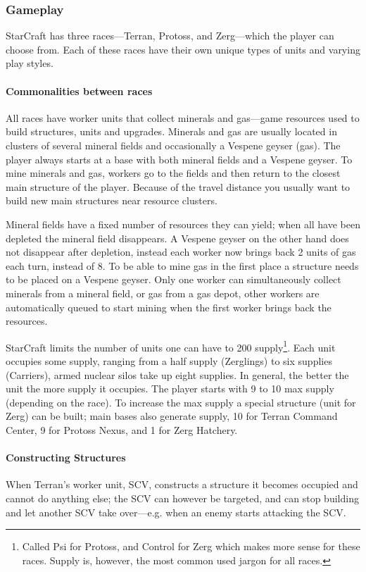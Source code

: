 \subsubsection{Gameplay} StarCraft has three races—Terran, Protoss, and Zerg—which the player can
choose from. Each of these races have their own unique types of units and varying play styles.

\paragraph{Commonalities between races} All races have worker units that collect minerals and
gas—game resources used to build structures, units and upgrades. Minerals and gas are usually
located in clusters of several mineral fields and occasionally a Vespene geyser (gas). The player
always starts at a base with both mineral fields and a Vespene geyser. To mine minerals and gas,
workers go to the fields and then return to the closest main structure of the player. Because of the
travel distance you usually want to build new main structures near resource clusters.

Mineral fields have a fixed number of resources they can yield; when all have been depleted the
mineral field disappears. A Vespene geyser on the other hand does not disappear after depletion,
instead each worker now brings back 2 units of gas each turn, instead of 8. To be able to mine gas
in the first place a structure needs to be placed on a Vespene geyser. Only one worker can
simultaneously collect minerals from a mineral field, or gas from a gas depot, other workers are
automatically queued to start mining when the first worker brings back the resources.

\label{sec:starcraft_supply} StarCraft limits the number of units one can have to 200
supply\footnote{Called Psi for Protoss, and Control for Zerg which makes more sense for these races.
Supply is, however, the most common used jargon for all races.}. Each unit occupies some supply,
ranging from a half supply (Zerglings) to six supplies (Carriers), armed nuclear silos take up eight
supplies. In general, the better the unit the more supply it occupies. The player starts with 9 to
10 max supply (depending on the race). To increase the max supply a special structure (unit for
Zerg) can be built; main bases also generate supply, 10 for Terran Command Center, 9 for Protoss
Nexus, and 1 for Zerg Hatchery.

\paragraph{Constructing Structures} When Terran's worker unit, SCV, constructs a structure it
becomes occupied and cannot do anything else; the SCV can however be targeted, and can stop building
and let another SCV take over—e.g. when an enemy starts attacking the SCV.

